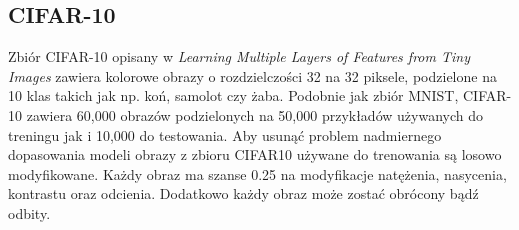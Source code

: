 \documentclass[
    left=2.5cm,         %
    right=2.5cm,        %
    top=2.5cm,          %
    bottom=3cm,         %
    bindingoffset=6mm,  %
    nohyphenation=false %
]{eiti/eiti-thesis}
\begin{document}
    \subsection{CIFAR-10}
    Zbiór CIFAR-10 opisany w \textit{Learning Multiple Layers of Features from Tiny Images} \cite{Krizhevsky2009LearningML} zawiera kolorowe obrazy o rozdzielczości 32 na 32 piksele,
    podzielone na 10 klas takich jak np. koń, samolot czy żaba. Podobnie jak zbiór MNIST, CIFAR-10 zawiera
    60,000 obrazów podzielonych na 50,000 przykładów używanych do treningu jak i 10,000 do testowania.
    Aby usunąć problem nadmiernego dopasowania modeli obrazy z zbioru CIFAR10 używane
    do trenowania są losowo modyfikowane. Każdy obraz ma szanse 0.25
    na modyfikacje natężenia, nasycenia, kontrastu oraz odcienia. Dodatkowo każdy obraz może zostać obrócony bądź odbity.

\end{document}
